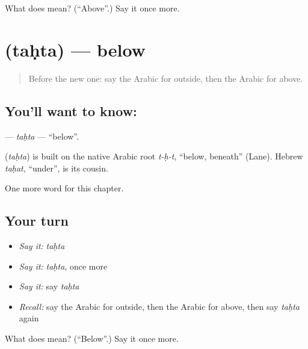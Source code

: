 \begin{tcolorbox}[breakable,colback=teal!4,colframe=teal!35!black,title={Before you move on}]
What does  mean? (\textquotedblleft{}Above\textquotedblright{}.) Say it once more.
\end{tcolorbox}
\section[\texorpdfstring{\ar{تحت} (taḥta)}{تحت (taḥta)}]{ (taḥta) — below}

\label{lesson:AR-C89-tahta}



\begin{quote}
Before the new one: say the Arabic for outside, then the Arabic for above.
\end{quote}

\subsection*{You'll want to know: }
\textbf{} — \emph{taḥta} — \textquotedblleft{}below\textquotedblright{}.

\begin{cousinweb}
\textbf{} (\emph{taḥta}) is built on the native Arabic root \emph{t-ḥ-t}, \textquotedblleft{}below, beneath\textquotedblright{} (Lane). Hebrew \emph{taḥat}, \textquotedblleft{}under\textquotedblright{}, is its cousin.
\end{cousinweb}

\begin{grammarlens}[title={What you've built}]
One more word for this chapter.
\end{grammarlens}

\subsection*{Your turn}
\begin{itemize}
\raggedright
  \item \emph{Say it:} \emph{taḥta}
  \item \emph{Say it:} \emph{taḥta}, once more
  \item \emph{Say it:} say \emph{taḥta}
  \item \emph{Recall:} say the Arabic for outside, then the Arabic for above, then say \emph{taḥta} again
\end{itemize}

\begin{tcolorbox}[breakable,colback=teal!4,colframe=teal!35!black,title={Before you move on}]
What does  mean? (\textquotedblleft{}Below\textquotedblright{}.) Say it once more.
\end{tcolorbox}

